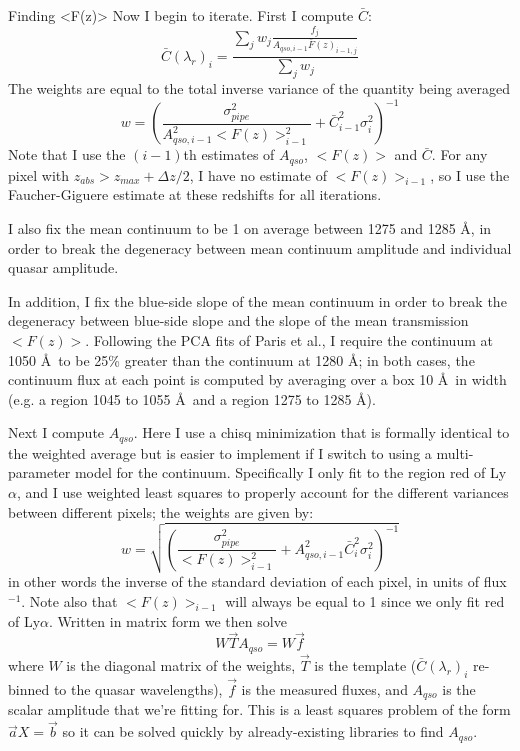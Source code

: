 \documentclass[12pt]{aastex}
\begin{document}
\begin{section}{Finding <F(z)>}
Now I begin to iterate.  First I compute $\bar{C}$:
\begin{equation}
\bar{C}(\lambda_r)_{i} = \frac{\sum_j w_j \frac{f_j}{A_{qso,i-1} \bar{F}(z)_{i-1,j}}}{\sum_j w_j}
\label{eqn:c_i}
\end{equation}
 The weights are equal to the total inverse variance of the quantity being averaged
\begin{equation}
w = \left(\frac{\sigma_{pipe}^2}{A_{qso,i-1}^2 <F(z)>_{i-1}^2} + \bar{C}_{i-1}^2 \sigma_i^2\right)^{-1}
\label{eqn:wt_for_c_i}
\end{equation}
Note that I use the $(i-1)$th estimates of $A_{qso}$, $<F(z)>$ and $\bar{C}$. 
For any pixel with $z_{abs} > z_{max} + \Delta z/2$, I have no estimate of $<F(z)>_{i-1}$, so I use
the Faucher-Giguere estimate at these redshifts for all iterations.

I also fix the mean continuum to be 1 on average between 1275 and 1285 \AA, in order to break the degeneracy
between mean continuum amplitude and individual quasar amplitude.

In addition, I fix the blue-side slope of the mean continuum in order to break the degeneracy between
blue-side slope and the slope of the mean transmission $<F(z)>$.  Following the PCA fits of Paris et al., 
I require the continuum at 1050 \AA\ to be 25\% greater than the continuum at 1280 \AA; in both cases,
the continuum flux at each point is computed by averaging over a box 10 \AA\ in width (e.g. a region 1045 to 1055 \AA\
and a region 1275 to 1285 \AA).

Next I compute $A_{qso}$.  Here I use a chisq minimization that is formally identical to the weighted average but is easier to implement
if I switch to using a multi-parameter model for the continuum.
Specifically I only fit to the region red of Ly$\alpha$,
and I use weighted least squares to properly account for the different variances between different pixels; the weights are given by:
\begin{equation}
w = \sqrt{\left(\frac{\sigma_{pipe}^2}{<F(z)>_{i-1}^2} + A_{qso,i-1}^2 \bar{C}_{i}^2 \sigma_i^2\right)^{-1}}
\label{eqn:wt_for_least_squares}
\end{equation}
in other words the inverse of the standard deviation of each pixel, in units of flux$^{-1}$.
Note also that $<F(z)>_{i-1}$ will always be equal to 1 since we only fit red of Ly$\alpha$.
Written in matrix form we then solve
\begin{equation}
W \vec{T} A_{qso} = W \vec{f}
\label{eqn:lls}
\end{equation}
where $W$ is the diagonal matrix of the weights, $\vec{T}$ is the template ($\bar{C}(\lambda_r)_i$ re-binned to the quasar wavelengths), $\vec{f}$ is the measured fluxes, 
and $A_{qso}$ is the scalar amplitude that we're fitting for.  This is a least squares problem of the form $\vec{a} X = \vec{b}$ so it can be
solved quickly by already-existing libraries to find $A_{qso}$.


\end{section}
\end{document}
